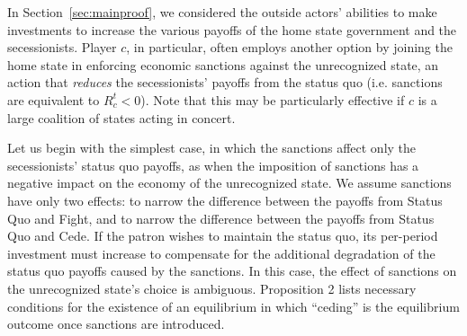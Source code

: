 
In Section~\ref{sec:mainproof}, we considered the outside actors' abilities to make investments to increase the various payoffs of the home state government and the secessionists. Player $c$, in particular, often employs another option by joining the home state in enforcing economic sanctions against the unrecognized state, an action that \emph{reduces} the secessionists' payoffs from the status quo (i.e. sanctions are equivalent to $R_c^t < 0$). Note that this may be particularly effective if $c$ is a large coalition of states acting in concert. 

Let us begin with the simplest case, in which the sanctions affect only the secessionists' status quo payoffs, as when the imposition of sanctions has a negative impact on the economy of the unrecognized state. We assume sanctions have only two effects: to narrow the difference between the payoffs from Status Quo and Fight, and to narrow the difference between the payoffs from Status Quo and Cede. If the patron wishes to maintain the status quo, its per-period investment must increase to compensate for the additional degradation of the status quo payoffs caused by the sanctions. In this case, the effect of sanctions on the unrecognized state's choice is ambiguous. Proposition 2 lists necessary conditions for the existence of an equilibrium in which ``ceding'' is the equilibrium outcome once sanctions are introduced.

